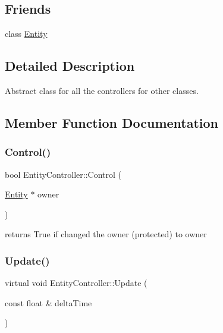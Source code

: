 \subsection*{Friends}
\begin{DoxyCompactItemize}
\item 
class \mbox{\hyperlink{class_entity_controller_a614439ccac0344926adc4c0165d64060}{Entity}}
\end{DoxyCompactItemize}


\subsection{Detailed Description}
Abstract class for all the controllers for other classes. 

\subsection{Member Function Documentation}
\mbox{\label{class_entity_controller_acd8733f9db40bb100708e3c890279288}} 
\subsubsection{\texorpdfstring{Control()}{Control()}}
{\footnotesize\ttfamily bool Entity\+Controller\+::\+Control (\begin{DoxyParamCaption}\item[{\mbox{\hyperlink{class_entity}{Entity}} $\ast$}]{owner }\end{DoxyParamCaption})\hspace{0.3cm}{\ttfamily [private]}}

returns True if changed the owner (protected) to owner \mbox{\label{class_entity_controller_ab7f285a1c788ab04b9f0c0260dc8c523}} 
\subsubsection{\texorpdfstring{Update()}{Update()}}
{\footnotesize\ttfamily virtual void Entity\+Controller\+::\+Update (\begin{DoxyParamCaption}\item[{const float \&}]{delta\+Time }\end{DoxyParamCaption})\hspace{0.3cm}{\ttfamily [pure virtual]}}

